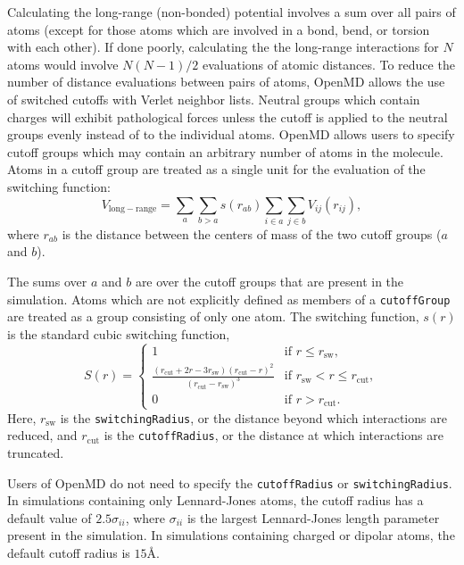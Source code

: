 \documentclass[]{book}
\begin{document}
Calculating the long-range (non-bonded) potential involves a sum over
all pairs of atoms (except for those atoms which are involved in a
bond, bend, or torsion with each other).  If done poorly, calculating
the the long-range interactions for $N$ atoms would involve $N(N-1)/2$
evaluations of atomic distances.  To reduce the number of distance
evaluations between pairs of atoms, {\sc OpenMD} allows the use of
switched cutoffs with Verlet neighbor lists.\cite{Allen87} Neutral
groups which contain charges will exhibit pathological forces unless
the cutoff is applied to the neutral groups evenly instead of to the
individual atoms.\cite{leach01:mm}  {\sc OpenMD} allows users to
specify cutoff groups which may contain an arbitrary number of atoms
in the molecule.  Atoms in a cutoff group are treated as a single unit
for the evaluation of the switching function:
\begin{equation}
V_{\mathrm{long-range}} = \sum_{a} \sum_{b>a} s(r_{ab}) \sum_{i \in a} \sum_{j \in b} V_{ij}(r_{ij}),
\end{equation}
where $r_{ab}$ is the distance between the centers of mass of the two
cutoff groups ($a$ and $b$).

The sums over $a$ and $b$ are over the cutoff groups that are present
in the simulation.  Atoms which are not explicitly defined as members
of a {\tt cutoffGroup} are treated as a group consisting of only one
atom.  The switching function, $s(r)$ is the standard cubic switching
function,
\begin{equation}
S(r) = 
	\begin{cases}
	1 & \text{if $r \le r_{\text{sw}}$},\\
	\frac{(r_{\text{cut}} + 2r - 3r_{\text{sw}})(r_{\text{cut}} - r)^2}
	{(r_{\text{cut}} - r_{\text{sw}})^3} 
	& \text{if $r_{\text{sw}} < r \le r_{\text{cut}}$}, \\
	0 & \text{if $r > r_{\text{cut}}$.}
	\end{cases}
\label{eq:dipoleSwitching}
\end{equation}
Here, $r_{\text{sw}}$ is the {\tt switchingRadius}, or the distance
beyond which interactions are reduced, and $r_{\text{cut}}$ is the
{\tt cutoffRadius}, or the distance at which interactions are
truncated.

Users of {\sc OpenMD} do not need to specify the {\tt cutoffRadius} or
{\tt switchingRadius}.  In simulations containing only Lennard-Jones
atoms, the cutoff radius has a default value of $2.5\sigma_{ii}$,
where $\sigma_{ii}$ is the largest Lennard-Jones length parameter
present in the simulation.  In simulations containing charged or
dipolar atoms, the default cutoff radius is $15 \mbox{\AA}$.  
\end{document}
